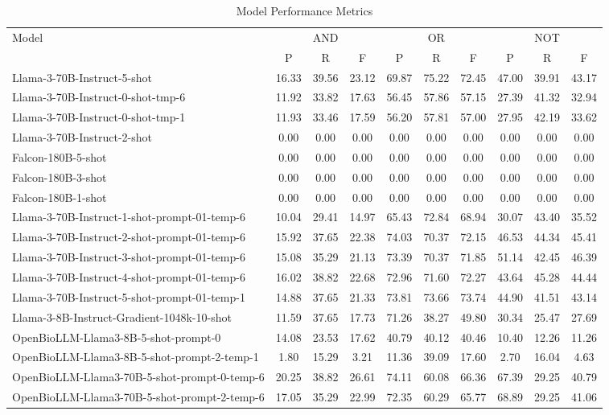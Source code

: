 \begin{table}[h]
\centering
\begin{tabular}{lccccccccc}
\toprule
Model & \multicolumn{3}{c}{AND} & \multicolumn{3}{c}{OR} & \multicolumn{3}{c}{NOT} \\
\cmidrule(lr){2-4}  \cmidrule(lr){5-7}  \cmidrule(lr){8-10}
 & P & R & F & P & R & F & P & R & F \\
\midrule
Llama-3-70B-Instruct-5-shot & 16.33 & 39.56 & 23.12 & 69.87 & 75.22 & 72.45 & 47.00 & 39.91 & 43.17 \\
Llama-3-70B-Instruct-0-shot-tmp-6 & 11.92 & 33.82 & 17.63 & 56.45 & 57.86 & 57.15 & 27.39 & 41.32 & 32.94 \\
Llama-3-70B-Instruct-0-shot-tmp-1 & 11.93 & 33.46 & 17.59 & 56.20 & 57.81 & 57.00 & 27.95 & 42.19 & 33.62 \\
Llama-3-70B-Instruct-2-shot & 0.00 & 0.00 & 0.00 & 0.00 & 0.00 & 0.00 & 0.00 & 0.00 & 0.00 \\
Falcon-180B-5-shot & 0.00 & 0.00 & 0.00 & 0.00 & 0.00 & 0.00 & 0.00 & 0.00 & 0.00 \\
Falcon-180B-3-shot & 0.00 & 0.00 & 0.00 & 0.00 & 0.00 & 0.00 & 0.00 & 0.00 & 0.00 \\
Falcon-180B-1-shot & 0.00 & 0.00 & 0.00 & 0.00 & 0.00 & 0.00 & 0.00 & 0.00 & 0.00 \\
Llama-3-70B-Instruct-1-shot-prompt-01-temp-6 & 10.04 & 29.41 & 14.97 & 65.43 & 72.84 & 68.94 & 30.07 & 43.40 & 35.52 \\
Llama-3-70B-Instruct-2-shot-prompt-01-temp-6 & 15.92 & 37.65 & 22.38 & 74.03 & 70.37 & 72.15 & 46.53 & 44.34 & 45.41 \\
Llama-3-70B-Instruct-3-shot-prompt-01-temp-6 & 15.08 & 35.29 & 21.13 & 73.39 & 70.37 & 71.85 & 51.14 & 42.45 & 46.39 \\
Llama-3-70B-Instruct-4-shot-prompt-01-temp-6 & 16.02 & 38.82 & 22.68 & 72.96 & 71.60 & 72.27 & 43.64 & 45.28 & 44.44 \\
Llama-3-70B-Instruct-5-shot-prompt-01-temp-1 & 14.88 & 37.65 & 21.33 & 73.81 & 73.66 & 73.74 & 44.90 & 41.51 & 43.14 \\
Llama-3-8B-Instruct-Gradient-1048k-10-shot & 11.59 & 37.65 & 17.73 & 71.26 & 38.27 & 49.80 & 30.34 & 25.47 & 27.69 \\
OpenBioLLM-Llama3-8B-5-shot-prompt-0 & 14.08 & 23.53 & 17.62 & 40.79 & 40.12 & 40.46 & 10.40 & 12.26 & 11.26 \\
OpenBioLLM-Llama3-8B-5-shot-prompt-2-temp-1 & 1.80 & 15.29 & 3.21 & 11.36 & 39.09 & 17.60 & 2.70 & 16.04 & 4.63 \\
OpenBioLLM-Llama3-70B-5-shot-prompt-0-temp-6 & 20.25 & 38.82 & 26.61 & 74.11 & 60.08 & 66.36 & 67.39 & 29.25 & 40.79 \\
OpenBioLLM-Llama3-70B-5-shot-prompt-2-temp-6 & 17.05 & 35.29 & 22.99 & 72.35 & 60.29 & 65.77 & 68.89 & 29.25 & 41.06 \\
\bottomrule
\end{tabular}
\caption{Model Performance Metrics}
\label{tab:model_metrics}
\end{table}
